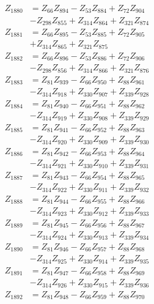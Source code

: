 \begin{multicols}{2}
\begin{align}
Z_{1880} &= Z_{66}Z_{894} - Z_{53}Z_{884} + Z_{72}Z_{904}  \nonumber \\
&- Z_{298}Z_{855} + Z_{314}Z_{864} + Z_{321}Z_{874} \nonumber \\
Z_{1881} &= Z_{66}Z_{895} - Z_{53}Z_{885} + Z_{72}Z_{905}  \nonumber \\
&+ Z_{314}Z_{865} + Z_{321}Z_{875} \nonumber \\
Z_{1882} &= Z_{66}Z_{896} - Z_{53}Z_{886} + Z_{72}Z_{906}  \nonumber \\
&- Z_{298}Z_{856} + Z_{314}Z_{866} + Z_{321}Z_{876} \nonumber \\
Z_{1883} &= Z_{81}Z_{939} - Z_{66}Z_{950} + Z_{88}Z_{961}  \nonumber \\
&- Z_{314}Z_{918} + Z_{330}Z_{907} + Z_{339}Z_{928} \nonumber \\
Z_{1884} &= Z_{81}Z_{940} - Z_{66}Z_{951} + Z_{88}Z_{962}  \nonumber \\
&- Z_{314}Z_{919} + Z_{330}Z_{908} + Z_{339}Z_{929} \nonumber \\
Z_{1885} &= Z_{81}Z_{941} - Z_{66}Z_{952} + Z_{88}Z_{963}  \nonumber \\
&- Z_{314}Z_{920} + Z_{330}Z_{909} + Z_{339}Z_{930} \nonumber \\
Z_{1886} &= Z_{81}Z_{942} - Z_{66}Z_{953} + Z_{88}Z_{964}  \nonumber \\
&- Z_{314}Z_{921} + Z_{330}Z_{910} + Z_{339}Z_{931} \nonumber \\
Z_{1887} &= Z_{81}Z_{943} - Z_{66}Z_{954} + Z_{88}Z_{965}  \nonumber \\
&- Z_{314}Z_{922} + Z_{330}Z_{911} + Z_{339}Z_{932} \nonumber \\
Z_{1888} &= Z_{81}Z_{944} - Z_{66}Z_{955} + Z_{88}Z_{966}  \nonumber \\
&- Z_{314}Z_{923} + Z_{330}Z_{912} + Z_{339}Z_{933} \nonumber \\
Z_{1889} &= Z_{81}Z_{945} - Z_{66}Z_{956} + Z_{88}Z_{967}  \nonumber \\
&- Z_{314}Z_{924} + Z_{330}Z_{913} + Z_{339}Z_{934} \nonumber \\
Z_{1890} &= Z_{81}Z_{946} - Z_{66}Z_{957} + Z_{88}Z_{968}  \nonumber \\
&- Z_{314}Z_{925} + Z_{330}Z_{914} + Z_{339}Z_{935} \nonumber \\
Z_{1891} &= Z_{81}Z_{947} - Z_{66}Z_{958} + Z_{88}Z_{969}  \nonumber \\
&- Z_{314}Z_{926} + Z_{330}Z_{915} + Z_{339}Z_{936} \nonumber \\
Z_{1892} &= Z_{81}Z_{948} - Z_{66}Z_{959} + Z_{88}Z_{970}  \nonumber \\

\end{align}
\end{multicols}
